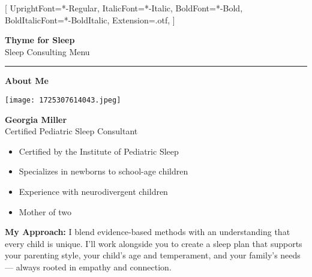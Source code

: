 \documentclass{article}
\newcommand{\sectiontitle}[1]{%
{\color{accentcolor}\normalsize\bfseries #1}%
\vspace{0.15em} %
}
\begin{document}
\setmainfont{Montserrat}[
    UprightFont=*-Regular,
    ItalicFont=*-Italic,
    BoldFont=*-Bold,
    BoldItalicFont=*-BoldItalic,
    Extension=.otf,
]
\onehalfspacing %

\begin{center}
{\Huge\bfseries\color{accentcolor} Thyme for Sleep}\\[2pt] %
{\normalsize Sleep Consulting Menu} %
\end{center}

\vspace{0.4em} %
\hrule
\vspace{0.4em} %

\sectiontitle{About Me}

\begin{center} %
    \texttt{[image: 1725307614043.jpeg]} %
\end{center}
\vspace{0.2em} %

\normalsize %
\textbf{Georgia Miller} \\
Certified Pediatric Sleep Consultant \\
\vspace{0.05cm} %
\begin{itemize}[leftmargin=*,noitemsep,topsep=0pt,itemsep=0pt] %
    \item Certified by the Institute of Pediatric Sleep
    \item Specializes in newborns to school-age children
    \item Experience with neurodivergent children
    \item Mother of two
\end{itemize}

\vspace{0.2em} %
\textbf{My Approach:} I blend evidence-based methods with an understanding that every child is unique. I'll work alongside you to create a sleep plan that supports your parenting style, your child's age and temperament, and your family's needs — always rooted in empathy and connection.
\end{document}
